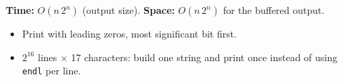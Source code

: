 \begin{complexitybox}
\textbf{Time:} $O(n\,2^n)$ (output size). \textbf{Space:} $O(n\,2^n)$ for
the buffered output.
\end{complexitybox}

\begin{pitfallbox}
\begin{itemize}
  \item Print with leading zeros, most significant bit first.
  \item $2^{16}$ lines $\times$ 17 characters: build one string and print
        once instead of using \texttt{endl} per line.
\end{itemize}
\end{pitfallbox}
